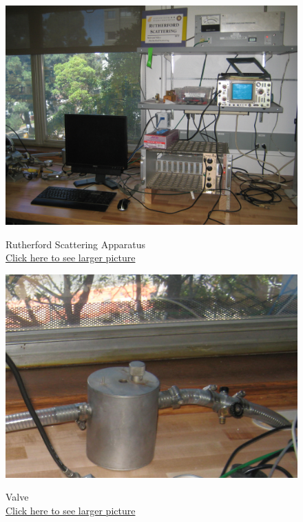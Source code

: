 \documentclass{../lab}
\begin{document}
\begin{figure}[!h]
  \href{http://experimentationlab.berkeley.edu/sites/default/files/images/RUT_3512.jpg}{\includegraphics[width=\linewidth,keepaspectratio]{images/RUT_3512.jpg}}
  \caption{Rutherford Scattering Apparatus \\ \href{http://experimentationlab.berkeley.edu/sites/default/files/images/RUT_3512.jpg}{Click here to see larger picture}}
  \label{fig:Apparatus}
\endminipage\hfill
{}
  \href{http://experimentationlab.berkeley.edu/sites/default/files/images/RUT_Valve.jpg}{\includegraphics[width=\linewidth,keepaspectratio]{images/RUT_Valve.jpg}}
  \caption{Valve \\
  \href{http://experimentationlab.berkeley.edu/sites/default/files/images/RUT_Valve.jpg}{Click here to see larger picture}}

\end{figure}
\end{document}
